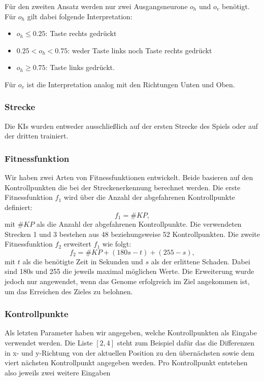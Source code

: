\documentclass[11pt,final,journal,a4paper,towside,towcolumn]{IEEEtran}
\begin{document}
Für den zweiten Ansatz werden nur zwei Ausgangsneurone $o_h$ und $o_v$ benötigt. Für $o_h$ gilt dabei folgende Interpretation:
\begin{itemize}
	\item $o_h\leq 0.25$: Taste rechts gedrückt
	\item $0.25 < o_h <0.75$: weder Taste links noch Taste rechts gedrückt
	\item $o_h\geq 0.75$: Taste links gedrückt.
\end{itemize}
Für $o_v$ ist die Interpretation analog mit den Richtungen Unten und Oben.

\subsubsection*{Strecke}
Die \acp{KI} wurden entweder ausschließlich auf der ersten Strecke des Spiels oder auf der dritten trainiert.

\subsubsection*{Fitnessfunktion}
Wir haben zwei Arten von Fitnessfunktionen entwickelt. Beide basieren auf den Kontrollpunkten die bei der Streckenerkennung berechnet werden.
Die erste Fitnessfunktion $f_1$ wird über die Anzahl der abgefahrenen Kontrollpunkte definiert:
\begin{equation}
f_1 = \#KP,
\end{equation}
mit $\#KP$ als die Anzahl der abgefahrenen Kontrollpunkte. Die verwendeten Strecken 1 und 3 bestehen aus 48 beziehungsweise 52 Kontrollpunkten.
Die zweite Fitnessfunktion $f_2$ erweitert $f_1$ wie folgt:
\begin{equation}
f_2=\#KP + (180s-t) + (255 - s),
\end{equation}
mit $t$ als die benötigte Zeit in Sekunden und $s$ als der erlittene Schaden. Dabei sind 180s und 255 die jeweils maximal möglichen Werte. Die Erweiterung wurde jedoch nur angewendet, wenn das Genome erfolgreich im Ziel angekommen ist, um das Erreichen des Zieles zu belohnen.

\subsubsection*{Kontrollpunkte}
Als letzten Parameter haben wir angegeben, welche Kontrollpunkten als Eingabe verwendet werden. Die Liste $\left[2, 4\right]$ steht zum Beispiel dafür das die Differenzen in x- und y-Richtung von der aktuellen Position zu den übernächsten sowie dem viert nächsten Kontrollpunkt angegeben werden. Pro Kontrollpunkt entstehen also jeweils zwei weitere Eingaben
\end{document}
